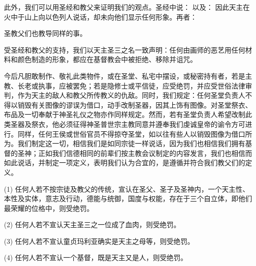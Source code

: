 此外，我们可以用圣经和教父来证明我们的观点。圣经中说： 以及： 因此天主在火中于山上向以色列人说话，却未向他们显示任何形象。再者： \par

圣教父们也教导同样的事。\par

受圣经和教父的支持，我们以天主圣三之名一致声明：任何由画师的恶艺用任何材料和颜色制造的形象，都应在基督教会中被拒绝、移除并诅咒。\par

今后凡胆敢制作、敬礼此类物件，或在圣堂、私宅中摆设，或秘密持有者，若是主教、长老或执事，应被罢免；若是隐修士或平信徒，应受绝罚，并应受世俗法律审判，作为天主的敌人和教父所传教义的仇敌。同时，我们规定：任何圣堂负责人不得以销毁有关图像的谬误为借口，动手改制圣器，因其上饰有图像。对圣堂祭衣、布品及一切奉献于神圣礼仪之物亦作同样规定。然而，若有圣堂负责人希望改制此类圣器及祭衣，他必须征得神圣普世宗主教同意并遵奉我们虔诚皇帝的谕令方可进行。同样，任何王侯或世俗官员不得掠夺圣堂，如以往有些人以销毁图像为借口所为。我们制定这一切，相信我们是如同宗徒一样说话，因为我们也相信我们拥有基督的圣神；正如我们信德相同的前辈们按主教会议制定的内容发言，我们也相信而如此说话，并制定一项定义，表明我们认为合宜的，是遵循并符合我们教父们的定义。\par

(1) 任何人若不按宗徒及教父的传统，宣认在圣父、圣子及圣神内，一个天主性、本性及实体，意志及行动，德能与统御，国度与权能，存在于三个自立体，即他们最荣耀的位格中，则受绝罚。\par

(2) 任何人若不宣认天主圣三之一位成了血肉，则受绝罚。\par

(3) 任何人若不宣认童贞玛利亚确实是天主之母等，则受绝罚。\par

(4) 任何人若不宣认一个基督，既是天主又是人，则受绝罚。\par

